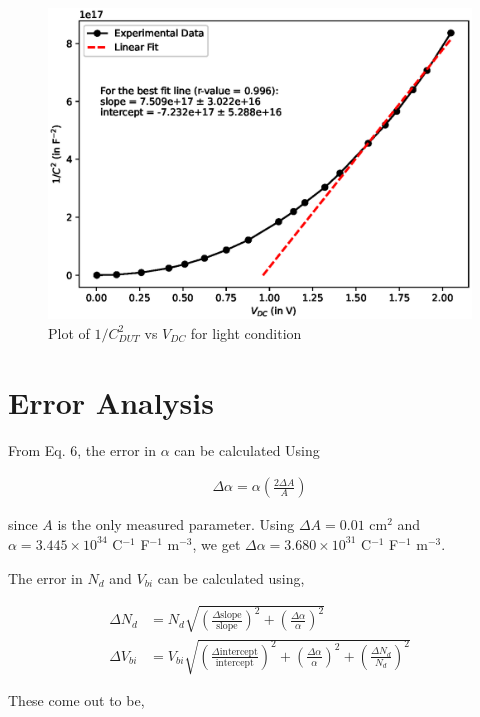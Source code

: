 \begin{figure}
    \centering
    \includegraphics[width=1\columnwidth]{images/light.eps}
    \caption{Plot of $1/C_{DUT}^2$ vs $V_{DC}$ for light condition}
\end{figure}

\section{Error Analysis}

From Eq. 6, the error in $\alpha$ can be calculated Using

\begin{align}
    \Delta \alpha = \alpha \left(\frac{2 \Delta A}{A}\right)
\end{align}

since $A$ is the only measured parameter. Using $\Delta A = 0.01$ cm$^2$ and $\alpha = 3.445 \times 10^{34}$ C$^{-1}$ F$^{-1}$ m$^{-3}$, we get $\Delta \alpha = 3.680 \times 10^{31}$ C$^{-1}$ F$^{-1}$ m$^{-3}$.

The error in $N_d$ and $V_{bi}$ can be calculated using,

\begin{align}
    \Delta N_d &= N_d \sqrt{\left(\frac{\Delta \text{slope}}{\text{slope}}\right)^2 + \left(\frac{\Delta \alpha}{\alpha}\right)^2}\\
    \Delta V_{bi} &= V_{bi} \sqrt{\left(\frac{\Delta \text{intercept}}{\text{intercept}}\right)^2 + \left(\frac{\Delta \alpha}{\alpha}\right)^2 + \left(\frac{\Delta N_d}{N_d}\right)^2}
\end{align}

These come out to be,

